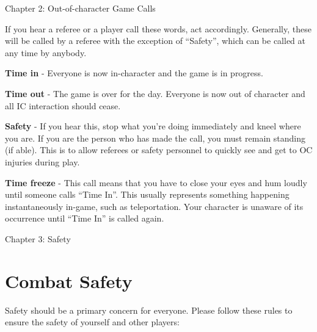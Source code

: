 \documentclass{scrbook}
\begin{document}
Chapter 2: Out-of-character Game Calls

If you hear a referee or a player call these words, act accordingly. Generally, these will be called by a referee with the exception of ``Safety'', which can be called at any time by anybody.

\textbf{Time in} - Everyone is now in-character and the game is in progress.

\textbf{Time out} - The game is over for the day. Everyone is now out of character and all IC interaction should cease.

\textbf{Safety} - If you hear this, stop what you're doing immediately and kneel where you are. If you are the person who has made the call, you must remain standing (if able). This is to allow referees or safety personnel to quickly see and get to OC injuries during play.

\textbf{Time freeze} - This call means that you have to close your eyes and hum loudly until someone calls ``Time In''. This usually represents something happening instantaneously in-game, such as teleportation. Your character is unaware of its occurrence until ``Time In'' is called again.

Chapter 3: Safety

\section{Combat Safety}

Safety should be a primary concern for everyone. Please follow these rules to ensure the safety of yourself and other players:
\end{document}

